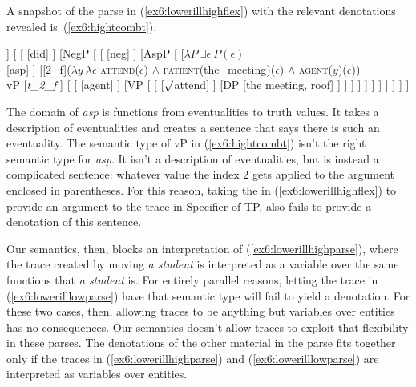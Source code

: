 A snapshot of the parse in (\ref{ex6:lowerillhighflex}) with the relevant denotations revealed is~(\ref{ex6:hightcombt}).
\medskip
\begin{fullwidth}
\begin{exe}
\raggedright
	\ex \label{ex6:hightcombt}
	\small
	\begin{forest}
	[TP
		[$\lambda P\ \exists x$ \textsc{student}($x$) $\wedge$ $P(x)$\\DP [a student, roof] ]
		[
			[ [did] ]
			[NegP [
				[ [neg] ]
				[AspP [
					[$\lambda P\ \exists \epsilon\ P(\epsilon)$\\ [asp] ]
					[{[}$2$_{f}{]}($\lambda y\ \lambda \epsilon$ \textsc{attend}($\epsilon$) $\wedge$ \textsc{patient}(the\_meeting)($\epsilon$) $\wedge$ \textsc{agent}($y$)($\epsilon$))\\vP 
						[\emph{t_{2}_{f}} ]
						[
							[ [agent] ]
							[VP [
								[ [$\surd$attend] ]
								[DP [the meeting, roof] ]
							] ]
						 ]
					 ]
				] ]
			] ]
		 ]
	]
	\end{forest}	
\end{exe}
\end{fullwidth}
\medskip
The domain of \emph{asp} is functions from eventualities to truth values. It takes a description of eventualities and creates a sentence that says there is such an eventuality. The semantic type of vP in (\ref{ex6:hightcombt}) isn't the right semantic type for \emph{asp}. It isn't a description of eventualities, but is instead a complicated sentence: whatever value the index $2$ gets applied to the argument enclosed in parentheses. For this reason, taking the  in (\ref{ex6:lowerillhighflex}) to provide an argument to the trace in Specifier of TP, also fails to provide a denotation of this sentence.

Our semantics, then, blocks an interpretation of (\ref{ex6:lowerillhighparse}), where the trace created by moving \emph{a student} is interpreted as a variable over the same functions that \emph{a student} is. For entirely parallel reasons, letting the trace in (\ref{ex6:lowerilllowparse}) have that semantic type will fail to yield a denotation. For these two cases, then, allowing traces to be anything but variables over entities has no consequences. Our semantics doesn't allow traces to exploit that flexibility in these parses. The denotations of the other material in the parse fits together only if the traces in (\ref{ex6:lowerillhighparse}) and (\ref{ex6:lowerilllowparse}) are interpreted as variables over entities.

